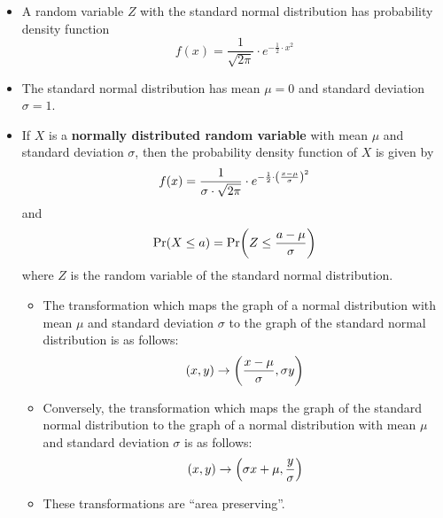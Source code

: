 \documentclass[12pt,a4paper,titlepage]{article}
\DeclarePairedDelimiter {\pars}  {  (      }     {  )      }
\begin{document}
            \begin{SummaryBox}[title=The standard normal distribution, breakable]
                \begin{itemize}[leftmargin=*]
                    \item A random variable $Z$ with the standard normal distribution has probability density function
                    \[
                        f(x) = \frac{1}{\sqrt{ 2\pi }} \cdot e^{ -\frac{1}{2} \cdot x^2 }
                    \]
                    \item The standard normal distribution has mean $\mu = 0$ and standard deviation $\sigma = 1$.
                \end{itemize}
                
                \begin{SummaryExtensionBox}[title=Transformations of normal distributions]
                    \begin{itemize}[leftmargin=*]
                        \item If $X$ is a \textbf{normally distributed random variable} with mean $\mu$ and standard deviation $\sigma$, then the probability density function of $X$ is given by
                        \[
                            f(x) = \frac{1}{\sigma \cdot \sqrt{ 2\pi }} \cdot e^{ -\frac{1}{2} \cdot \pars*{ \frac{x - \mu}{\sigma} }^2 }
                        \]
                        and
                        \[
                            \Pr(X \leq a) = \Pr\pars*{Z \leq \frac{a - \mu}{\sigma}}
                        \]
                        where $Z$ is the random variable of the standard normal distribution.
                        \begin{itemize}[topsep=0pt]
                            \item The transformation which maps the graph of a normal distribution with mean $\mu$ and standard deviation $\sigma$ to the graph of the standard normal distribution is as follows:
                            \[
                                (x,y) \to \pars*{ \frac{x - \mu}{\sigma}, \sigma y }
                            \]
                            \item Conversely, the transformation which maps the graph of the standard normal distribution to the graph of a normal distribution with mean $\mu$ and standard deviation $\sigma$ is as follows:
                            \[
                                (x,y) \to \pars*{ \sigma x + \mu, \frac{y}{\sigma} }
                            \]
                            \item These transformations are ``area preserving''.
                        \end{itemize}
                    \end{itemize}
                \end{SummaryExtensionBox}
                

\end{SummaryBox}
\end{document}
